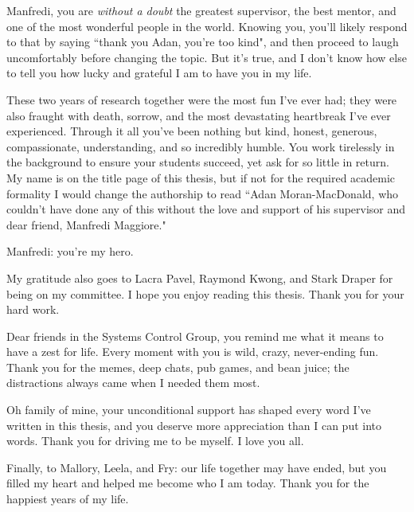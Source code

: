 

\begin{acknowledgements}
    Manfredi, you are \textit{without a doubt} the greatest supervisor, the
    best mentor, and one of the most wonderful people in the world.
    Knowing you, you'll likely respond to that by saying 
    ``thank you Adan, you're too kind", and then proceed to laugh uncomfortably before
    changing the topic.
    But it's true, and I don't know how else to tell you how lucky and grateful I am to
    have you in my life.

    These two years of research together were the most fun I've ever
    had; they were also fraught with death, sorrow, and the most
    devastating heartbreak I've ever experienced.
    Through it all you've been nothing but kind, honest, generous,
    compassionate, understanding, and so incredibly humble.
    You work tirelessly in the background to ensure your students
    succeed, yet ask for so little in return.
    My name is on the title page of this thesis, but if not for the required
    academic formality I would change the authorship to read
    ``Adan Moran-MacDonald, who couldn't have done any of this without the love
    and support of his supervisor and dear friend, Manfredi Maggiore."

    Manfredi: you're my hero. 

    \bigskip %

    My gratitude also goes to Lacra Pavel, Raymond Kwong, and Stark Draper for
    being on my committee. I hope you enjoy reading this thesis. Thank you for
    your hard work.

    Dear friends in the Systems Control Group,
    you remind me what it means to have a zest for life. 
    Every moment with you is wild, crazy, never-ending fun. Thank you
    for the memes, deep chats, pub games, and bean juice; the distractions
    always came when I needed them most.

    Oh family of mine, your unconditional support has shaped every word I've
    written in this thesis, and you deserve more appreciation than I can put
    into words. Thank you for driving me to be myself. I love you all.

    Finally, to Mallory, Leela, and Fry: our life together may have ended, but
    you filled my heart and helped me become who I am today. 
    Thank you for the happiest years of my life.

\end{acknowledgements}

